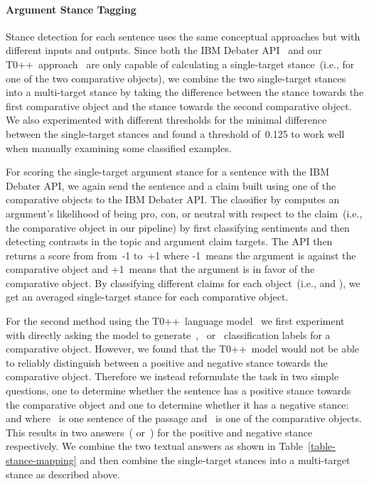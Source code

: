 \paragraph{Argument Stance Tagging}


Stance detection for each sentence uses the same conceptual approaches but with different inputs and outputs.
Since both the IBM Debater API~\cite{BarHaimBDSS2017} and our T0++~approach~\cite{SanhWRBSACSLRDBXTSSKCNDCJWMSYPBWNRSSFFTBGBWR2021} are only capable of calculating a single-target stance~(i.e., for one of the two comparative objects), we combine the two single-target stances into a multi-target stance by taking the difference between the stance towards the first comparative object and the stance towards the second comparative object.
We also experimented with different thresholds for the minimal difference between the single-target stances and found a threshold of~0.125 to work well when manually examining some classified examples.

For scoring the single-target argument stance for a sentence with the IBM Debater API, we again send the sentence and a claim built using one of the comparative objects to the IBM Debater API.
The classifier by \citet{BarHaimBDSS2017} computes an argument's likelihood of being pro, con, or neutral with respect to the claim~(i.e., the comparative object in our pipeline) by first classifying sentiments and then detecting contrasts in the topic and argument claim targets.
The API then returns a score from from~-1 to~+1 where -1~means the argument is against the comparative object and +1~means that the argument is in favor of the comparative object.
By classifying different claims for each object~(i.e.,  and ), we get an averaged single-target stance for each comparative object.

For the second method using the T0++~language model~\cite{SanhWRBSACSLRDBXTSSKCNDCJWMSYPBWNRSSFFTBGBWR2021} we first experiment with directly asking the model to generate~, ~or~ classification labels for a comparative object.
However, we found that the T0++~model would not be able to reliably distinguish between a positive and negative stance towards the comparative object.
Therefore we instead reformulate the task in two simple questions, one to determine whether the sentence has a positive stance towards the comparative object and one to determine whether it has a negative stance:  and  where ~is one sentence of the passage and ~is one of the comparative objects.
This results in two answers~( or~) for the positive and negative stance respectively. We combine the two textual answers as shown in Table~\ref{table-stance-mapping} and then combine the single-target stances into a multi-target stance as described above.

